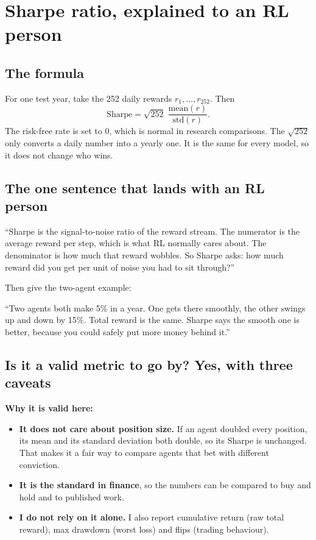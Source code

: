 \documentclass[11pt,a4paper]{article}
\begin{document}
\section{Sharpe ratio, explained to an RL person}

\subsection{The formula}
For one test year, take the 252 daily rewards $r_1, \ldots, r_{252}$. Then
\[
\text{Sharpe} = \sqrt{252}\; \frac{\text{mean}(r)}{\text{std}(r)}.
\]
The risk-free rate is set to 0, which is normal in research comparisons. The $\sqrt{252}$
only converts a daily number into a yearly one. It is the same for every model, so it does
not change who wins.

\subsection{The one sentence that lands with an RL person}

\begin{sayit}
``Sharpe is the signal-to-noise ratio of the reward stream. The numerator is the average
reward per step, which is what RL normally cares about. The denominator is how much that
reward wobbles. So Sharpe asks: how much reward did you get per unit of noise you had to
sit through?''
\end{sayit}

Then give the two-agent example:
\begin{sayit}
``Two agents both make 5\% in a year. One gets there smoothly, the other swings up and down by
15\%. Total reward is the same. Sharpe says the smooth one is better, because you could
safely put more money behind it.''
\end{sayit}

\subsection{Is it a valid metric to go by? Yes, with three caveats}

\textbf{Why it is valid here:}
\begin{itemize}
  \item \textbf{It does not care about position size.} If an agent doubled every position,
        its mean and its standard deviation both double, so its Sharpe is unchanged. That
        makes it a fair way to compare agents that bet with different conviction.
  \item \textbf{It is the standard in finance}, so the numbers can be compared to buy and hold
        and to published work.
  \item \textbf{I do not rely on it alone.} I also report cumulative return (raw total reward),
        max drawdown (worst loss) and flips (trading behaviour).
\end{itemize}
\end{document}

